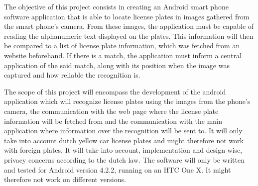 
The objective of this project consists in creating an Android smart phone software application that is able to locate license plates in images gathered from the smart phone's camera. From these images, the application must be capable of reading the alphanumeric text displayed on the plates. This information will then be compared to a list of license plate information, which was fetched from an website beforehand. If there is a match, the application must inform a central application of the said match, along with its position when the image was captured and how reliable the recognition is.


The scope of this project will encompass the development of the android application which will recognize license plates using the images from the phone's camera, the communication with the web page where the license plate information will be fetched from and the communication with the main application where information over the recognition will be sent to. It will only take into account dutch yellow car license plates and might therefore not work with foreign plates.
It will take into account, implementation and design wise, privacy concerns according to the dutch law.
The software will only be written and tested for Android version 4.2.2, running on an HTC One X. It might therefore not work on different versions.
